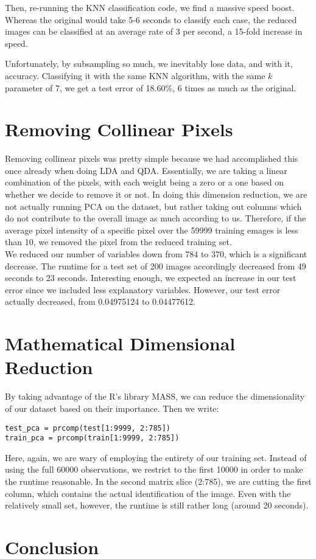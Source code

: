 \documentclass[10pt]{extarticle}
\begin{document}
Then, re-running the KNN classification code, we find a massive speed boost. Whereas the original would take 5-6 seconds to classify each case, the reduced images can be classified at an average rate of 3 per second, a 15-fold increase in speed. 

Unfortunately, by subsampling so much, we inevitably lose data, and with it, accuracy. Classifying it with the same KNN algorithm, with the same $k$ parameter of 7, we get a test error of 18.60\%, 6 times as much as the original. 




\section{Removing Collinear Pixels}
\blank

Removing collinear pixels was pretty simple because we had accomplished this once already when doing LDA and QDA. Essentially, we are taking a linear combination of the pixels, with each weight being a zero or a one based on whether we decide to remove it or not. In doing this dimension reduction, we are not actually running PCA on the dataset, but rather taking out columns which do not contribute to the overall image as much according to us. Therefore, if the average pixel intensity of a specific pixel over the 59999 training emages is less than 10, we removed the pixel from the reduced training set.\\

We reduced our number of variables down from 784 to 370, which is a significant decrease. The runtime for a test set of 200 images accordingly decreased from 49 seconds to 23 seconds. Interesting enough, we expected an increase in our test error since we included less explanatory variables. However, our test error actually decreased, from 0.04975124 to 0.04477612.

\section{Mathematical Dimensional Reduction}
\blank
By taking advantage of the R's library MASS, we can reduce the dimensionality of our dataset based on their importance. Then we write:

\begin{verbatim}
test_pca = prcomp(test[1:9999, 2:785])
train_pca = prcomp(train[1:9999, 2:785])
\end{verbatim}

Here, again, we are wary of employing the entirety of our training set. Instead of using the full 60000 observations, we restrict to the first 10000 in order to make the runtime reasonable. In the second matrix slice (2:785), we are cutting the first column, which contains the actual identification of the image. Even with the relatively small set, however, the runtime is still rather long (around 20 seconds). 

\section{Conclusion}
\blank 
\end{document}
